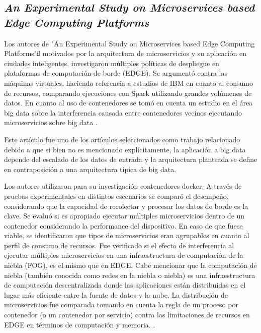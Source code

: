 \subsection{
  \textbf{\emph{An Experimental Study on Microservices based Edge Computing Platforms}
  }
}

Los autores de "An Experimental Study on Microservices based Edge Computing Platforms"ß\cite{qu_experimental_2020} motivados por la arquitectura de microservicios y su aplicación en ciudades inteligentes, investigaron múltiples políticas de despliegue en plataformas de computación de borde (EDGE). Se argumentó contra las máquinas virtuales, haciendo referencia a estudios de IBM en cuanto al consumo de recursos, comparando ejecuciones con Spark \cite{ApacheSpark} utilizando grandes volúmenes de datos. En cuanto al uso de contenedores se tomó en cuenta un estudio en el área big data sobre la interferencia causada entre contenedores vecinos ejecutando microservicios sobre big data \cite{BigDataWikipedia}.\par

Este artículo fue uno de los artículos seleccionados como trabajo relacionado debido a que si bien no es mencionado explícitamente, la aplicación a big data depende del escalado de los datos de entrada y la arquitectura planteada se define en contraposición a una arquitectura típica de big data.\par

Los autores utilizaron para su investigación contenedores docker.
A través de pruebas experimentales en distintos escenarios se comparó el desempeño, considerando que la capacidad de recolectar y procesar los datos de borde es la clave.
Se evaluó si es apropiado ejecutar múltiples microservicios dentro de un contenedor considerando la performance del dispositivo.
En caso de que fuese viable, se identificaron que tipos de microservicios eran agrupables en cuanto al perfil de consumo de recursos.
Fue verificado si el efecto de interferencia al ejecutar múltiples microservicios en una infraestructura de computación de la niebla (FOG), es el mismo que en EDGE. Cabe mencionar que la computación de niebla (también conocida como redes en la niebla o niebla)
es una infraestructura de computación descentralizada donde las aplicaciones están distribuidas en el lugar más eficiente entre la fuente de datos y la nube.
La distribución de microservicios fue comparada tomando en cuenta la regla de un proceso por contenedor (o un contenedor por servicio)
\cite{cont_por_serv}
contra las limitaciones de recursos en EDGE en términos de computación y memoria.
\cite{webfog}.\par

